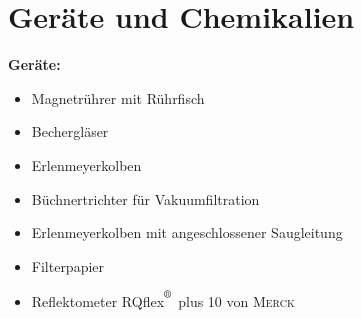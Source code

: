 \chapter{Geräte und Chemikalien}
\label{sec:geraete}

\textbf{Geräte:}
\begin{itemize}
	\item Magnetrührer mit Rührfisch
	\item Bechergläser
	\item Erlenmeyerkolben
	\item Büchnertrichter für Vakuumfiltration
	\item Erlenmeyerkolben mit angeschlossener Saugleitung
	\item Filterpapier
	\item Reflektometer RQflex$^{\textsuperscript{\textregistered}}$ plus 10 von \textsc{Merck}
\end{itemize}

\vspace*{5mm}

